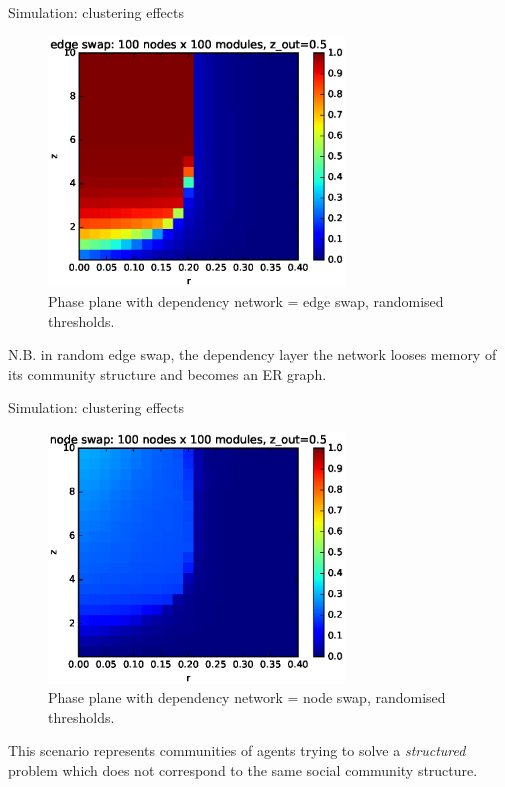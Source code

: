 \documentclass[10pt, xcolor=dvipsnames]{beamer}
\begin{document}
\begin{frame}{Simulation: clustering effects}

\begin{figure}
\centering
\includegraphics[width=0.7\textwidth]{figures/pp_double_edge_swap_100x100}
\caption{Phase plane with dependency network = edge swap, randomised thresholds. }
\end{figure}

N.B. in random edge swap, the dependency layer the network looses memory of its community structure and becomes an ER graph.

\end{frame}
\begin{frame}{Simulation: clustering effects}

\begin{figure}
\centering
\includegraphics[width=0.7\textwidth]{figures/pp_double_node_swap_100x100}
\caption{Phase plane with dependency network = node swap, randomised thresholds. }
\end{figure}

This scenario represents communities of agents trying to solve a \emph{structured} problem which does not correspond to the same social community structure.
\end{frame}
\end{document}
